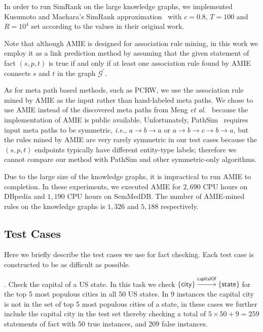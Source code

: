 \documentclass[reprint,twocolumn,showpacs,preprintnumbers,amsmath, aps,pre,amssymb]{revtex4-1}
\newcommand\ie{\emph{i.e.}}
\begin{document}
In order to run SimRank on the large knowledge graphs, we implemented Kusumoto and Maehara's SimRank approximation~\cite{Kusumoto2014} with $c=0.8$, $T=100$ and $R=10^4$ set according to the values in their original work.

Note that although AMIE is designed for association rule mining, in this work we employ it as a link prediction method by assuming that the given statement of fact $(s,p,t)$ is true if and only if at least one association rule found by AMIE connects $s$ and $t$ in the graph $\mathcal{G}^\prime$. 

As for meta path based methods, such as PCRW, we use the association rule mined by AMIE as the input rather than hand-labeled meta paths. We chose to use AMIE instead of the discovered meta paths from Meng {\em et al.}~\cite{Meng2015} because the implementation of AMIE is public available. Unfortunately, PathSim~\cite{Sun2011} requires input meta paths to be symmetric, \ie, $a\rightarrow b\rightarrow a$ or $a\rightarrow b\rightarrow c\rightarrow b\rightarrow a$, but the rules mined by AMIE are very rarely symmetric in our test cases because the $(s,p,t)$ endpoints typically have different entity-type labels; therefore we cannot compare our method with PathSim and other symmetric-only algorithms.

Due to the large size of the knowledge graphs, it is impractical to run AMIE to completion. In these experiments, we executed AMIE for $2,690$ CPU hours on DBpedia and $1,190$ CPU hours on SemMedDB. The number of AMIE-mined rules on the knowledge graphs is $1,326$ and $5,188$ respectively.

\subsection{Test Cases} \label{sec:test_case}

Here we briefly describe the test cases we use for fact checking. Each test case is constructed to be as difficult as possible.

\vspace{5pt}. Check the capital of a US state. In this task we check $\{\textsf{city}\}\xrightarrow{\textsf{capitalOf}}\{\textsf{state}\}$ for the top 5 most populous cities in all 50 US states. In 9 instances the capital city is not in the set of top 5 most populous cities of a state, in these cases we further include the capital city in the test set thereby checking a total of $5\times 50 + 9=259$ statements of fact with 50 true instances, and 209 false instances.
\end{document}
